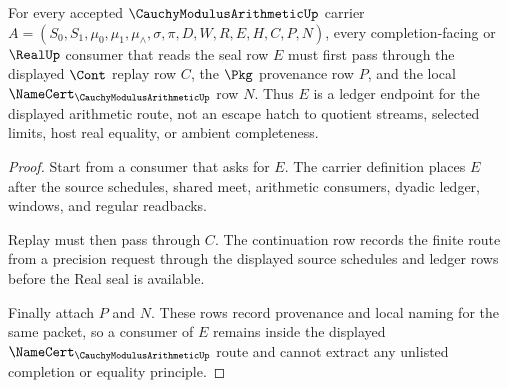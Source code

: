 \begin{theorem}
\label{thm:cauchy-modulus-arithmetic-namecert-obligation-ledger}
For every accepted $\CauchyModulusArithmeticUp$ carrier
$A=(S_0,S_1,\mu_0,\mu_1,\mu_{\wedge},\sigma,\pi,D,W,R,E,H,C,P,N)$, every
completion-facing or $\RealUp$ consumer that reads the seal row $E$ must first
pass through the displayed $\Cont$ replay row $C$, the $\Pkg$ provenance row
$P$, and the local $\NameCert_{\CauchyModulusArithmeticUp}$ row $N$. Thus $E$
is a ledger endpoint for the displayed arithmetic route, not an escape hatch
to quotient streams, selected limits, host real equality, or ambient
completeness.
\end{theorem}
\begin{proof}
Start from a consumer that asks for $E$. The carrier definition places $E$
after the source schedules, shared meet, arithmetic consumers, dyadic ledger,
windows, and regular readbacks.

Replay must then pass through $C$. The continuation row records the finite
route from a precision request through the displayed source schedules and
ledger rows before the Real seal is available.

Finally attach $P$ and $N$. These rows record provenance and local naming for
the same packet, so a consumer of $E$ remains inside the displayed
$\NameCert_{\CauchyModulusArithmeticUp}$ route and cannot extract any
unlisted completion or equality principle.
\end{proof}


